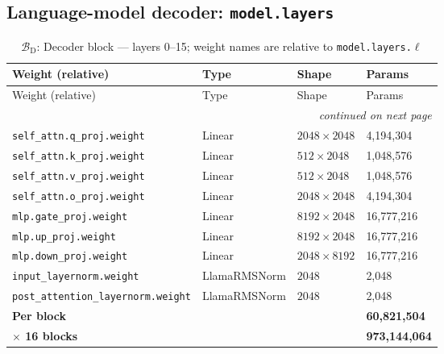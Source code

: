 \documentclass[10pt,a4paper]{article}
\begin{document}
\subsection{Language-model decoder: \texttt{model.layers}}
\begin{longtable}{p{6.6cm}>{\raggedright\arraybackslash}p{3.6cm}ll}
\caption{$\mathcal{B}_{\mathrm{D}}$: Decoder block --- layers 0--15; weight names are relative to \texttt{model.layers.$\ell$}}\\
\toprule
Weight (relative) & Type & Shape & Params \\
\midrule
\endfirsthead
\toprule
Weight (relative) & Type & Shape & Params \\
\midrule
\endhead
\midrule \multicolumn{4}{r}{\textit{continued on next page}} \\
\endfoot
\bottomrule
\endlastfoot
\texttt{self\_attn.\allowbreak{}q\_proj.\allowbreak{}weight} & Linear & $2048 \times 2048$ & 4,194,304 \\
\texttt{self\_attn.\allowbreak{}k\_proj.\allowbreak{}weight} & Linear & $512 \times 2048$ & 1,048,576 \\
\texttt{self\_attn.\allowbreak{}v\_proj.\allowbreak{}weight} & Linear & $512 \times 2048$ & 1,048,576 \\
\texttt{self\_attn.\allowbreak{}o\_proj.\allowbreak{}weight} & Linear & $2048 \times 2048$ & 4,194,304 \\
\texttt{mlp.\allowbreak{}gate\_proj.\allowbreak{}weight} & Linear & $8192 \times 2048$ & 16,777,216 \\
\texttt{mlp.\allowbreak{}up\_proj.\allowbreak{}weight} & Linear & $8192 \times 2048$ & 16,777,216 \\
\texttt{mlp.\allowbreak{}down\_proj.\allowbreak{}weight} & Linear & $2048 \times 8192$ & 16,777,216 \\
\texttt{input\_layernorm.\allowbreak{}weight} & Llama\allowbreak{}RMSNorm & $2048$ & 2,048 \\
\texttt{post\_attention\_layernorm.\allowbreak{}weight} & Llama\allowbreak{}RMSNorm & $2048$ & 2,048 \\
\midrule \textbf{Per block} & & & \textbf{60,821,504} \\
\textbf{$\times$ 16 blocks} & & & \textbf{973,144,064} \\
\end{longtable}
\end{document}
